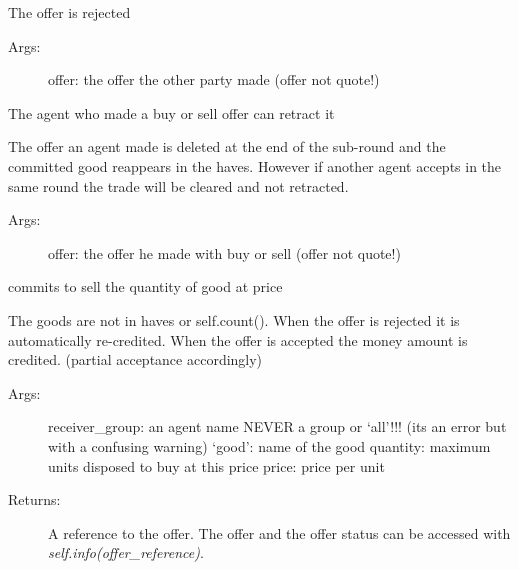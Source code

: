 \documentclass[letterpaper,10pt,english]{sphinxmanual}
\begin{document}
\begin{fulllineitems}
\begin{fulllineitems}
\label{Trade:abce.Trade.reject}
The offer is rejected
\begin{description}
\item[{Args:}] \leavevmode
offer: the offer the other party made
(offer not quote!)

\end{description}

\end{fulllineitems}


\begin{fulllineitems}
\label{Trade:abce.Trade.retract}
The agent who made a buy or sell offer can retract it

The offer an agent made is deleted at the end of the sub-round and the
committed good reappears in the haves. However if another agent
accepts in the same round the trade will be cleared and not retracted.
\begin{description}
\item[{Args:}] \leavevmode
offer: the offer he made with buy or sell
(offer not quote!)

\end{description}

\end{fulllineitems}


\begin{fulllineitems}
\label{Trade:abce.Trade.sell}
commits to sell the quantity of good at price

The goods are not in haves or self.count(). When the offer is
rejected it is automatically re-credited. When the offer is
accepted the money amount is credited. (partial acceptance
accordingly)
\begin{description}
\item[{Args:}] \leavevmode
receiver\_group: an agent name  NEVER a group or `all'!!!
(its an error but with a confusing warning)
`good': name of the good
quantity: maximum units disposed to buy at this price
price: price per unit

\item[{Returns:}] \leavevmode
A reference to the offer. The offer and the offer status can
be accessed with \emph{self.info(offer\_reference)}.


\end{description}
\end{fulllineitems}
\end{fulllineitems}
\end{document}
